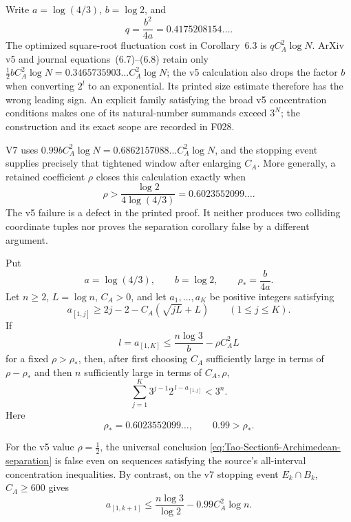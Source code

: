 \begin{sourceissue}
\label{sourceissue:Tao-v5-v7-section-six-reserve}
Write \(a=\log(4/3)\), \(b=\log2\), and
\[
 q=\frac{b^2}{4a}=0.4175208154\ldots.
\]
The optimized square-root fluctuation cost in Corollary~6.3 is
\(qC_A^2\log N\).  ArXiv v5 and journal equations~(6.7)--(6.8)
retain only \(\frac12bC_A^2\log N=0.3465735903\ldots C_A^2\log N\);
the v5 calculation also drops the factor \(b\) when converting \(2^l\)
to an exponential.  Its printed size estimate therefore has the wrong
leading sign.  An explicit family satisfying the broad v5 concentration
conditions makes one of its natural-number summands exceed \(3^N\); the
construction and its exact scope are recorded in F028.

V7 uses \(0.99bC_A^2\log N=0.6862157088\ldots C_A^2\log N\), and the
stopping event supplies precisely that tightened window after enlarging
\(C_A\).  More generally, a retained coefficient \(\rho\) closes this
calculation exactly when
\[
 \rho>\frac{\log2}{4\log(4/3)}
 =0.6023552099\ldots.
\]
The v5 failure is a defect in the printed proof.  It neither produces two
colliding coordinate tuples nor proves the separation corollary false by a
different argument.
\end{sourceissue}

\begin{proposition}
\label{prop:Tao-Section6-reserve-repair}
Put
\[
 a=\log(4/3),\qquad b=\log2,\qquad
 \rho_*=\frac{b}{4a}.
\]
Let \(n\ge2\), \(L=\log n\), \(C_A>0\), and let
\(a_1,\ldots,a_K\) be positive integers satisfying
\begin{equation}
\label{eq:Tao-Section6-prefix-lower}
 a_{[1,j]}\ge2j-2-C_A(\sqrt{jL}+L)
 \qquad(1\le j\le K).
\end{equation}
If
\[
 l=a_{[1,K]}
 \le\frac{n\log3}{b}-\rho C_A^2L
\]
for a fixed \(\rho>\rho_*\), then, after first choosing \(C_A\)
sufficiently large in terms of \(\rho-\rho_*\) and then \(n\) sufficiently
large in terms of \(C_A,\rho\),
\begin{equation}
\label{eq:Tao-Section6-Archimedean-separation}
 \sum_{j=1}^{K}3^{j-1}2^{\,l-a_{[1,j]}}<3^n.
\end{equation}
Here
\[
 \rho_*=0.6023552099\ldots,\qquad 0.99>\rho_*.
\]

For the v5 value \(\rho=\frac12\), the universal conclusion
\eqref{eq:Tao-Section6-Archimedean-separation} is false even on sequences
satisfying the source's all-interval concentration inequalities.  By
contrast, on the v7 stopping event \(E_k\cap B_k\), \(C_A\ge600\) gives
\[
 a_{[1,k+1]}
 \le\frac{n\log3}{\log2}-0.99C_A^2\log n.
\]
\end{proposition}

